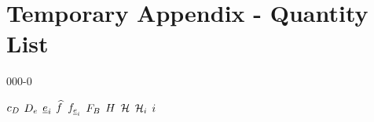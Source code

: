 \section{Temporary Appendix - Quantity List}

\begin{mitframe}{000-0}

$\dragcoeff$ \newline
$\eneatom$ \newline
$\uv$ \newline
$\mixfug$ \newline
$\dforce$ \newline
$\bodyforce$ \newline
$\magfield$ \newline
$\surfcurv$ \newline
$\henry$ \newline
$\currentdensity$ \newline

\end{mitframe}
